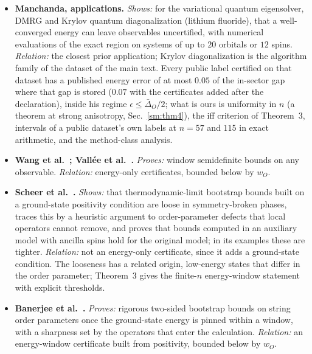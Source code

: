 \documentclass[aps,prx,onecolumn,10pt,nofootinbib,longbibliography,floatfix]{revtex4-2}
\theoremstyle{remark}
\begin{document}
\begin{itemize}
\item \textbf{Manchanda, applications.} \emph{Shows:} for the variational quantum eigensolver, DMRG and Krylov quantum diagonalization (lithium fluoride), that a well-converged energy can leave observables uncertified, with numerical evaluations of the exact region on systems of up to $20$ orbitals or $12$ spins. \emph{Relation:} the closest prior application; Krylov diagonalization is the algorithm family of the dataset of the main text. Every public label certified on that dataset has a published energy error of at most $0.05$ of the in-sector gap where that gap is stored ($0.07$ with the certificates added after the declaration), inside his regime $\epsilon\le\bar\Delta_O/2$; what is ours is uniformity in $n$ (a theorem at strong anisotropy, Sec.~\ref{sm:thm4}), the iff criterion of Theorem~3, intervals of a public dataset's own labels at $n=57$ and $115$ in exact arithmetic, and the method-class analysis. %
\item \textbf{Wang et al.~\cite{wang2024prx,wang2026scipost}; Vall\'ee et al.~\cite{vallee2026}.} \emph{Proves:} window semidefinite bounds on any observable. \emph{Relation:} energy-only certificates, bounded below by $w_O$. %
\item \textbf{Scheer et al.~\cite{scheer2025}.} \emph{Shows:} that thermodynamic-limit bootstrap bounds built on a ground-state positivity condition are loose in symmetry-broken phases, traces this by a heuristic argument to order-parameter defects that local operators cannot remove, and proves that bounds computed in an auxiliary model with ancilla spins hold for the original model; in its examples these are tighter. \emph{Relation:} not an energy-only certificate, since it adds a ground-state condition. The looseness has a related origin, low-energy states that differ in the order parameter; Theorem~3 gives the finite-$n$ energy-window statement with explicit thresholds. %
\item \textbf{Banerjee et al.~\cite{banerjee2026}.} \emph{Proves:} rigorous two-sided bootstrap bounds on string order parameters once the ground-state energy is pinned within a window, with a sharpness set by the operators that enter the calculation. \emph{Relation:} an energy-window certificate built from positivity, bounded below by $w_O$. %

\end{itemize}
\end{document}
